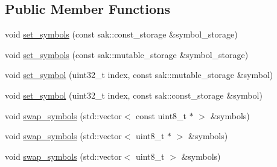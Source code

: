 \subsection*{Public Member Functions}
\begin{DoxyCompactItemize}
\item 
void \hyperlink{classkodo_1_1fake__symbol__storage_a6a59fd9563259a9b86db637884027434}{set\-\_\-symbols} (const sak\-::const\-\_\-storage \&symbol\-\_\-storage)
\begin{DoxyCompactList}\small\item\em \end{DoxyCompactList}\item 
void \hyperlink{classkodo_1_1fake__symbol__storage_a42326d6de35b64a8474ef3a42e9848a2}{set\-\_\-symbols} (const sak\-::mutable\-\_\-storage \&symbol\-\_\-storage)
\begin{DoxyCompactList}\small\item\em \end{DoxyCompactList}\item 
void \hyperlink{classkodo_1_1fake__symbol__storage_a0a260d9c7cb3fed6700df24fa0f53812}{set\-\_\-symbol} (uint32\-\_\-t index, const sak\-::mutable\-\_\-storage \&symbol)
\begin{DoxyCompactList}\small\item\em \end{DoxyCompactList}\item 
void \hyperlink{classkodo_1_1fake__symbol__storage_aa6460245b8736f8e7ffbb5aed63ee2f6}{set\-\_\-symbol} (uint32\-\_\-t index, const sak\-::const\-\_\-storage \&symbol)
\begin{DoxyCompactList}\small\item\em \end{DoxyCompactList}\item 
void \hyperlink{classkodo_1_1fake__symbol__storage_added66356c77887a7d166ff84c18d4b3}{swap\-\_\-symbols} (std\-::vector$<$ const uint8\-\_\-t $\ast$ $>$ \&symbols)
\begin{DoxyCompactList}\small\item\em \end{DoxyCompactList}\item 
void \hyperlink{classkodo_1_1fake__symbol__storage_ae4e3dae7fc20bbc411b81c0f7a05c608}{swap\-\_\-symbols} (std\-::vector$<$ uint8\-\_\-t $\ast$ $>$ \&symbols)
\begin{DoxyCompactList}\small\item\em \end{DoxyCompactList}\item 
void \hyperlink{classkodo_1_1fake__symbol__storage_abaa5d6bcbf8161ff3f6560ccd59596eb}{swap\-\_\-symbols} (std\-::vector$<$ uint8\-\_\-t $>$ \&symbols)
\begin{DoxyCompactList}\small\item\em \end{DoxyCompactList}\end{DoxyCompactItemize}


